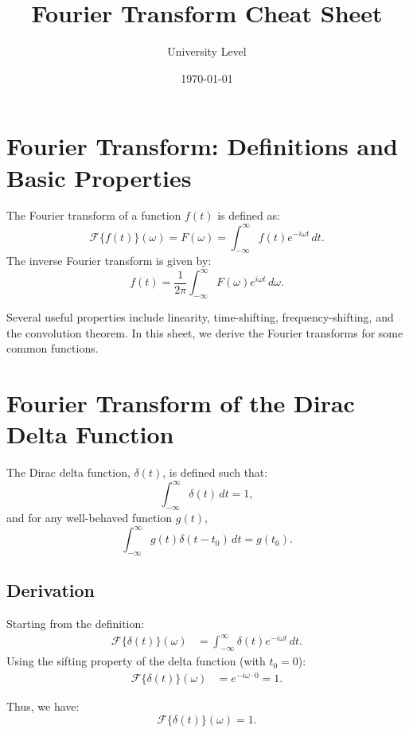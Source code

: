 \documentclass[11pt]{article}
\title{Fourier Transform Cheat Sheet}
\author{University Level}
\date{\today}
\begin{document}
\maketitle
\tableofcontents
\newpage

\section{Fourier Transform: Definitions and Basic Properties}

The Fourier transform of a function \( f(t) \) is defined as:
\begin{equation}
    \mathcal{F}\{f(t)\}(\omega) = F(\omega) = \int_{-\infty}^{\infty} f(t)e^{-i\omega t}\, dt.
\end{equation}
The inverse Fourier transform is given by:
\begin{equation}
    f(t) = \frac{1}{2\pi}\int_{-\infty}^{\infty} F(\omega)e^{i\omega t}\, d\omega.
\end{equation}

Several useful properties include linearity, time-shifting, frequency-shifting, and the convolution theorem. In this sheet, we derive the Fourier transforms for some common functions.

\newpage

\section{Fourier Transform of the Dirac Delta Function}

The Dirac delta function, \(\delta(t)\), is defined such that:
\[
\int_{-\infty}^{\infty}\delta(t) \, dt = 1,
\]
and for any well-behaved function \(g(t)\),
\[
\int_{-\infty}^{\infty} g(t)\delta(t-t_0)\, dt = g(t_0).
\]

\subsection*{Derivation}
Starting from the definition:
\begin{align}
    \mathcal{F}\{\delta(t)\}(\omega) &= \int_{-\infty}^{\infty} \delta(t) e^{-i\omega t}\, dt.
\end{align}
Using the sifting property of the delta function (with \(t_0 = 0\)):
\begin{align}
    \mathcal{F}\{\delta(t)\}(\omega) &= e^{-i\omega\cdot0} = 1.
\end{align}

Thus, we have:
\begin{equation}
    \boxed{\mathcal{F}\{\delta(t)\}(\omega) = 1.}
\end{equation}
\end{document}
